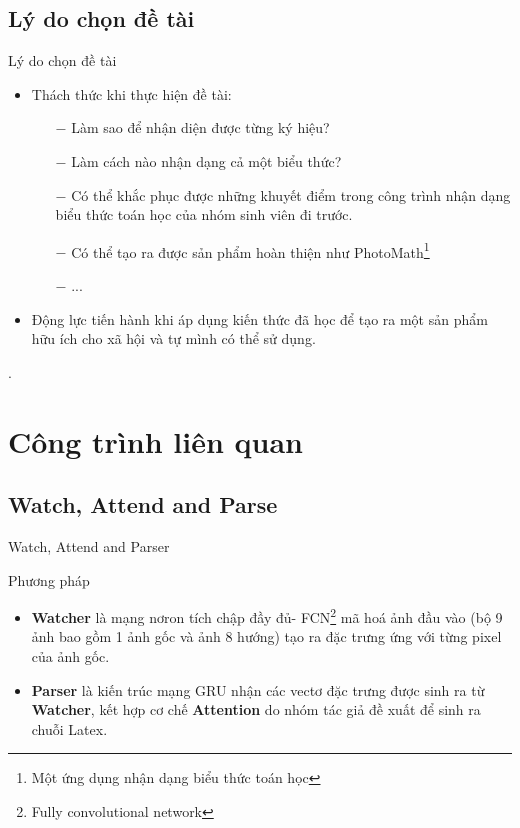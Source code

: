 \documentclass{beamer}
\begin{document}
\subsection{Lý do chọn đề tài}
	\begin{frame}{Lý do chọn đề tài}
		\begin{itemize}
			\item Thách thức khi thực hiện đề tài:
			\begin{itemize}
				\item[$-$] Làm sao để nhận diện được từng ký hiệu?
				\item[$-$] Làm cách nào nhận dạng cả một biểu thức?
				\item[$-$] Có thể khắc phục được những khuyết điểm trong công trình nhận dạng biểu thức toán học của nhóm sinh viên đi trước.
				\item [$-$]Có thể tạo ra được sản phẩm hoàn thiện như PhotoMath\footnote{Một ứng dụng nhận dạng biểu thức toán học} 
				\item[$-$] ...
			\end{itemize}
			\item Động lực tiến hành khi áp dụng kiến thức đã học để tạo ra một sản phẩm hữu ích cho xã hội và tự mình có thể sử dụng.
		\end{itemize}
.	\end{frame}

\section{Công trình liên quan}
\subsection{Watch, Attend and Parse}

\begin{frame}{Watch, Attend and Parser}
	\begin{block}{Phương pháp}
		\begin{itemize}
			\item \textbf{Watcher} là mạng nơron tích chập đầy đủ- FCN\footnote{Fully convolutional network} mã hoá ảnh đầu vào (bộ 9 ảnh bao gồm 1 ảnh gốc và ảnh 8 hướng) tạo ra đặc trưng ứng với từng pixel của ảnh gốc.
			\item \textbf{Parser} là kiến trúc mạng GRU nhận các vectơ đặc trưng được sinh ra từ \textbf{Watcher}, kết hợp cơ chế \textbf{Attention} do nhóm tác giả đề xuất để sinh ra chuỗi Latex.
		\end{itemize}
	\end{block}
\end{frame}
\end{document}
